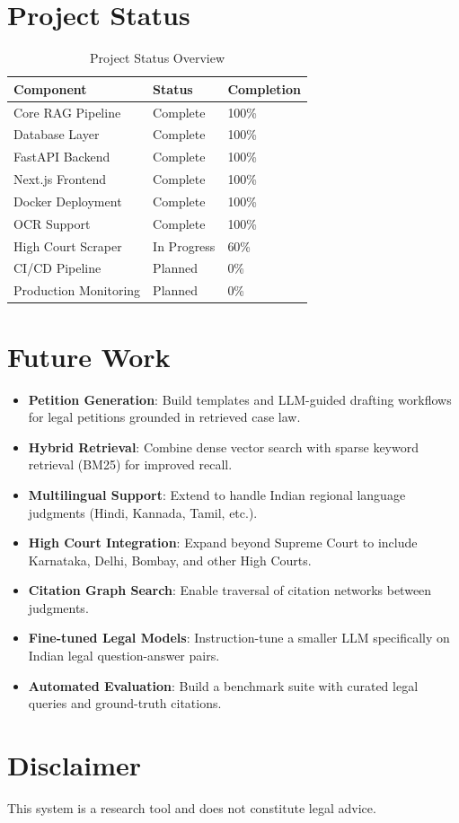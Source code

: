 \documentclass[11pt,a4paper]{article}
\begin{document}
\section{Project Status}

\begin{table}[H]
\centering
\begin{tabular}{lll}
\toprule
\textbf{Component} & \textbf{Status} & \textbf{Completion} \\
\midrule
Core RAG Pipeline & Complete & 100\% \\
Database Layer & Complete & 100\% \\
FastAPI Backend & Complete & 100\% \\
Next.js Frontend & Complete & 100\% \\
Docker Deployment & Complete & 100\% \\
OCR Support & Complete & 100\% \\
High Court Scraper & In Progress & 60\% \\
CI/CD Pipeline & Planned & 0\% \\
Production Monitoring & Planned & 0\% \\
\bottomrule
\end{tabular}
\caption{Project Status Overview}
\end{table}

\section{Future Work}

\begin{itemize}[noitemsep]
    \item \textbf{Petition Generation}: Build templates and LLM-guided
        drafting workflows for legal petitions grounded in retrieved
        case law.
    \item \textbf{Hybrid Retrieval}: Combine dense vector search with
        sparse keyword retrieval (BM25) for improved recall.
    \item \textbf{Multilingual Support}: Extend to handle Indian regional
        language judgments (Hindi, Kannada, Tamil, etc.).
    \item \textbf{High Court Integration}: Expand beyond Supreme Court to
        include Karnataka, Delhi, Bombay, and other High Courts.
    \item \textbf{Citation Graph Search}: Enable traversal of citation
        networks between judgments.
    \item \textbf{Fine-tuned Legal Models}: Instruction-tune a smaller
        LLM specifically on Indian legal question-answer pairs.
    \item \textbf{Automated Evaluation}: Build a benchmark suite with
        curated legal queries and ground-truth citations.
\end{itemize}

\section*{Disclaimer}
This system is a research tool and does not constitute legal advice.
\end{document}
